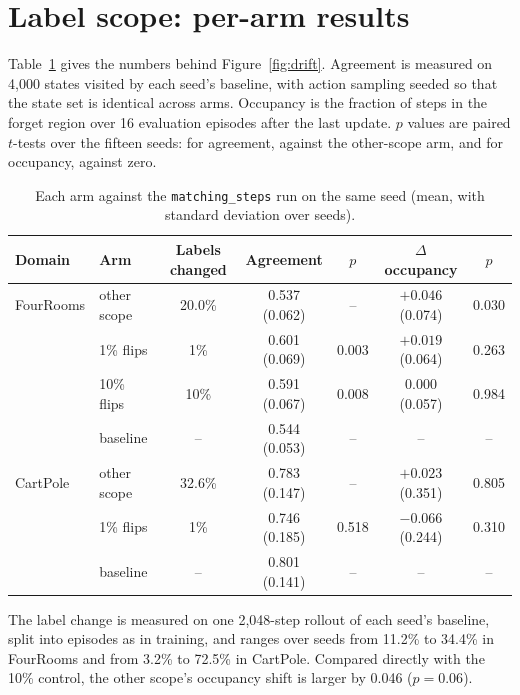 \section{Label scope: per-arm results}
\label{app:drift}

Table~\ref{tab:drift} gives the numbers behind Figure~\ref{fig:drift}. Agreement is measured on 4{,}000 states visited by each seed's baseline, with action sampling seeded so that the state set is identical across arms. Occupancy is the fraction of steps in the forget region over 16 evaluation episodes after the last update. $p$ values are paired $t$-tests over the fifteen seeds: for agreement, against the other-scope arm, and for occupancy, against zero.

\begin{table}[h]\centering\small
\caption{Each arm against the \texttt{matching\_steps} run on the same seed (mean, with standard deviation over seeds).}
\label{tab:drift}
\begin{tabular}{@{}llccccc@{}}\toprule
Domain & Arm & Labels changed & Agreement & $p$ & $\Delta$ occupancy & $p$ \\ \midrule
FourRooms & other scope & 20.0\% & 0.537 (0.062) & -- & $+0.046$ (0.074) & 0.030 \\
 & 1\% flips & 1\% & 0.601 (0.069) & 0.003 & $+0.019$ (0.064) & 0.263 \\
 & 10\% flips & 10\% & 0.591 (0.067) & 0.008 & $0.000$ (0.057) & 0.984 \\
 & baseline & -- & 0.544 (0.053) & -- & -- & -- \\
\midrule
CartPole & other scope & 32.6\% & 0.783 (0.147) & -- & $+0.023$ (0.351) & 0.805 \\
 & 1\% flips & 1\% & 0.746 (0.185) & 0.518 & $-0.066$ (0.244) & 0.310 \\
 & baseline & -- & 0.801 (0.141) & -- & -- & -- \\
\bottomrule\end{tabular}\end{table}

The label change is measured on one 2{,}048-step rollout of each seed's baseline, split into episodes as in training, and ranges over seeds from 11.2\% to 34.4\% in FourRooms and from 3.2\% to 72.5\% in CartPole. Compared directly with the 10\% control, the other scope's occupancy shift is larger by 0.046 ($p=0.06$).

